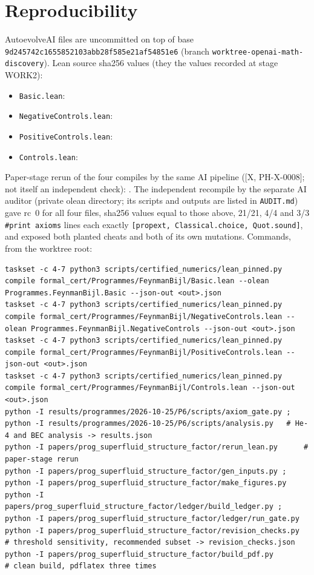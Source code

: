 \documentclass[11pt]{article}
\theoremstyle{remark}
\newcommand{\tier}[1]{\textsf{[#1]}}
\newcommand{\lean}[1]{\texttt{#1}}
\begin{document}
\section{Reproducibility}\label{sec:repro}
AutoevolveAI files are uncommitted on top of base \texttt{9d245742c1655852103abb28f585e21af54851e6} (branch \texttt{worktree-openai-math-discovery}). Lean source sha256 values (they \PLShaMatch{} the values recorded at stage WORK2):
\begin{itemize}\scriptsize
\item \texttt{Basic.lean}: \texttt{\PLShaBasic}
\item \texttt{NegativeControls.lean}: \texttt{\PLShaNeg}
\item \texttt{PositiveControls.lean}: \texttt{\PLShaPos}
\item \texttt{Controls.lean}: \texttt{\PLShaCtl}
\end{itemize}
Paper-stage rerun of the four compiles by the same AI pipeline (\tier{X, PH-X-0008}; not itself an independent check): \PLRerun. The independent recompile by the separate AI auditor (private olean directory; its scripts and outputs are listed in \texttt{AUDIT.md}) gave rc~0 for all four files, sha256 values equal to those above, 21/21, 4/4 and 3/3 \lean{\#print axioms} lines each exactly \lean{[propext, Classical.choice, Quot.sound]}, and exposed both planted cheats and both of its own mutations. Commands, from the worktree root:
\begin{lstlisting}[basicstyle=\ttfamily\tiny]
taskset -c 4-7 python3 scripts/certified_numerics/lean_pinned.py compile formal_cert/Programmes/FeynmanBijl/Basic.lean --olean Programmes.FeynmanBijl.Basic --json-out <out>.json
taskset -c 4-7 python3 scripts/certified_numerics/lean_pinned.py compile formal_cert/Programmes/FeynmanBijl/NegativeControls.lean --olean Programmes.FeynmanBijl.NegativeControls --json-out <out>.json
taskset -c 4-7 python3 scripts/certified_numerics/lean_pinned.py compile formal_cert/Programmes/FeynmanBijl/PositiveControls.lean --json-out <out>.json
taskset -c 4-7 python3 scripts/certified_numerics/lean_pinned.py compile formal_cert/Programmes/FeynmanBijl/Controls.lean --json-out <out>.json
python -I results/programmes/2026-10-25/P6/scripts/axiom_gate.py ; python -I results/programmes/2026-10-25/P6/scripts/analysis.py   # He-4 and BEC analysis -> results.json
python -I papers/prog_superfluid_structure_factor/rerun_lean.py      # paper-stage rerun
python -I papers/prog_superfluid_structure_factor/gen_inputs.py ; python -I papers/prog_superfluid_structure_factor/make_figures.py
python -I papers/prog_superfluid_structure_factor/ledger/build_ledger.py ; python -I papers/prog_superfluid_structure_factor/ledger/run_gate.py
python -I papers/prog_superfluid_structure_factor/revision_checks.py   # threshold sensitivity, recommended subset -> revision_checks.json
python -I papers/prog_superfluid_structure_factor/build_pdf.py        # clean build, pdflatex three times
\end{lstlisting}
\end{document}
